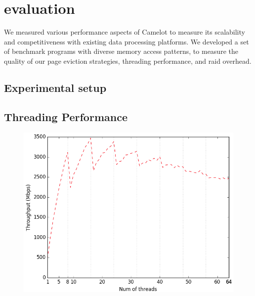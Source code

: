 \section{evaluation}
\label{sec:eval}

We measured various performance aspects of Camelot to measure its
scalability and competitiveness with existing data processing
platforms. We developed a set of benchmark programs with diverse
memory access patterns, to measure the quality of our page eviction
strategies, threading performance, and raid overhead.

\subsection{Experimental setup}

\subsection{Threading Performance}
\begin{figure}[H]
    \includegraphics[width=\columnwidth]{fig/throughputVsThreads}
    \caption{}
    \label{fig:througputVsThreads}
\end{figure}

